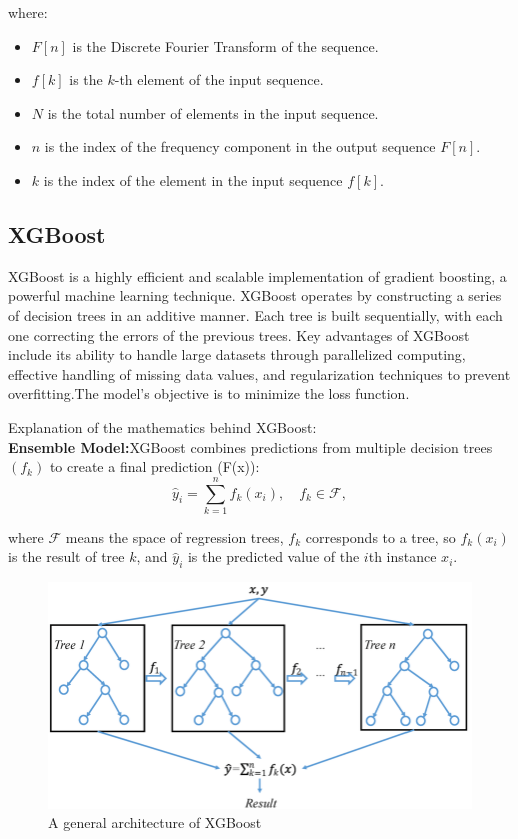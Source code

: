 \documentclass{ieeeojies}
\begin{document}
where:
\begin{itemize}
    \item $F[n]$ is the Discrete Fourier Transform of the sequence.
    \item $f[k]$ is the $k$-th element of the input sequence.
    \item $N$ is the total number of elements in the input sequence.
    \item $n$ is the index of the frequency component in the output sequence $F[n]$.
    \item $k$ is the index of the element in the input sequence $f[k]$.
\end{itemize}

\subsection{XGBoost}
XGBoost is a highly efficient and scalable implementation of gradient boosting, a powerful machine learning technique. XGBoost operates by constructing a series of decision trees in an additive manner. Each tree is built sequentially, with each one correcting the errors of the previous trees. Key advantages of XGBoost include its ability to handle large datasets through parallelized computing, effective handling of missing data values, and regularization techniques to prevent overfitting\cite{Xgboost}.The model’s objective is to minimize the loss function. 

Explanation of the mathematics behind XGBoost:\\
\textbf{Ensemble Model:}XGBoost combines predictions from multiple decision trees $(f_k)$ to create a final prediction (F(x))\cite{Xgboost}:
\begin{equation*}
\hat{y}_i = \sum_{k=1}^n f_k(x_i), \quad f_k \in \mathcal{F},
\end{equation*}


where \(\mathcal{F}\) means the space of regression trees, \( f_k \) corresponds to a tree, so \( f_k(x_i) \) is the result of tree \( k \), and \( \hat{y}_i \) is the predicted value of the \( i \)th instance \( x_i \).

\begin{figure}[H]
    \centering
\begin{minipage}{0.4\textwidth}
        \centering
        \includegraphics[width=\textwidth]{bibliography/Figure/xgboost.png}
        \caption{A general architecture of XGBoost}
        \label{fig:3}
\end{minipage}
\end{figure}
\end{document}
